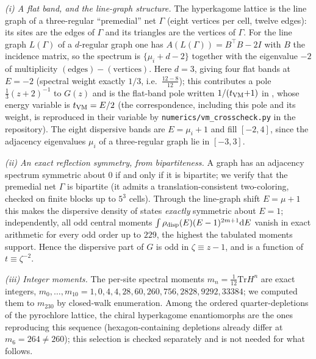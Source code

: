 \documentclass[11pt]{article}
\newcommand{\rmd}{\mathrm{d}}
\newcommand{\Tr}{\mathrm{Tr}}
\theoremstyle{plain}
\theoremstyle{remark}
\begin{document}
\emph{(i) A flat band, and the line-graph structure.} The hyperkagome lattice is the line graph of a three-regular
``premedial'' net $\Gamma$ (eight vertices per cell, twelve edges): its sites are the edges of $\Gamma$ and its
triangles are the vertices of $\Gamma$. For the line graph $L(\Gamma)$ of a $d$-regular graph one has
$A(L(\Gamma))=B^{\!\top}B-2I$ with $B$ the incidence matrix, so the spectrum is $\{\mu_i+d-2\}$ together with the
eigenvalue $-2$ of multiplicity $(\text{edges})-(\text{vertices})$. Here $d=3$, giving four flat bands at $E=-2$
(spectral weight exactly $1/3$, i.e.\ $\tfrac{12-8}{12}$); this contributes a pole $\tfrac13(z+2)^{-1}$ to $G(z)$
and is the flat-band pole written $1/(t_{\rm VM}{+}1)$ in \cite{VarmaMonien2013}, whose energy variable is
$t_{\rm VM}=E/2$ (the correspondence, including this pole and its weight, is reproduced in their variable by
\texttt{numerics/vm\_crosscheck.py} in the repository). The eight dispersive bands are $E=\mu_i+1$ and fill $[-2,4]$, since the adjacency
eigenvalues $\mu_i$ of a three-regular graph lie in $[-3,3]$.

\emph{(ii) An exact reflection symmetry, from bipartiteness.} A graph has an adjacency spectrum symmetric about
$0$ if and only if it is bipartite; we verify that the premedial net $\Gamma$ is bipartite (it admits a
translation-consistent two-coloring, checked on finite blocks up to $5^3$ cells). Through the line-graph shift $E=\mu+1$ this makes the dispersive density of states \emph{exactly}
symmetric about $E=1$; independently, all odd central moments
$\int\rho_{\rm disp}(E)(E-1)^{2m+1}\rmd E$ vanish in exact arithmetic for every odd order up to
$229$, the highest the tabulated moments support. Hence the dispersive part of
$G$ is odd in $\zeta\equiv z-1$, and is a function of $t\equiv\zeta^{-2}$.

\emph{(iii) Integer moments.} The per-site spectral moments $m_n=\frac{1}{12}\Tr H^n$ are exact integers,
$m_0,\dots,m_{10}=1,0,4,4,28,60,260,756,2828,9292,33384$; we computed them to $m_{230}$ by closed-walk enumeration.
Among the ordered quarter-depletions of the pyrochlore lattice, the chiral hyperkagome enantiomorphs are the ones
reproducing this sequence (hexagon-containing depletions already differ at $m_6=264\neq260$); this selection is
checked separately and is not needed for what follows.
\end{document}
